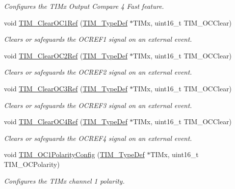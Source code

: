 \begin{DoxyCompactItemize}
\begin{DoxyCompactList}\small\item\em Configures the T\+I\+Mx Output Compare 4 Fast feature. \end{DoxyCompactList}\item 
void \hyperlink{group___t_i_m_ga34e926cd8a99cfcc7480b2d6de5118b6}{T\+I\+M\+\_\+\+Clear\+O\+C1\+Ref} (\hyperlink{struct_t_i_m___type_def}{T\+I\+M\+\_\+\+Type\+Def} $\ast$T\+I\+Mx, uint16\+\_\+t T\+I\+M\+\_\+\+O\+C\+Clear)
\begin{DoxyCompactList}\small\item\em Clears or safeguards the O\+C\+R\+E\+F1 signal on an external event. \end{DoxyCompactList}\item 
void \hyperlink{group___t_i_m_gac474ebc815d24c8a589969e0c68b27b0}{T\+I\+M\+\_\+\+Clear\+O\+C2\+Ref} (\hyperlink{struct_t_i_m___type_def}{T\+I\+M\+\_\+\+Type\+Def} $\ast$T\+I\+Mx, uint16\+\_\+t T\+I\+M\+\_\+\+O\+C\+Clear)
\begin{DoxyCompactList}\small\item\em Clears or safeguards the O\+C\+R\+E\+F2 signal on an external event. \end{DoxyCompactList}\item 
void \hyperlink{group___t_i_m_ga0bd9476a14bd346c319945ec4fa2bc67}{T\+I\+M\+\_\+\+Clear\+O\+C3\+Ref} (\hyperlink{struct_t_i_m___type_def}{T\+I\+M\+\_\+\+Type\+Def} $\ast$T\+I\+Mx, uint16\+\_\+t T\+I\+M\+\_\+\+O\+C\+Clear)
\begin{DoxyCompactList}\small\item\em Clears or safeguards the O\+C\+R\+E\+F3 signal on an external event. \end{DoxyCompactList}\item 
void \hyperlink{group___t_i_m_gaeee5fa66b26e7c6f71850272dc3028f3}{T\+I\+M\+\_\+\+Clear\+O\+C4\+Ref} (\hyperlink{struct_t_i_m___type_def}{T\+I\+M\+\_\+\+Type\+Def} $\ast$T\+I\+Mx, uint16\+\_\+t T\+I\+M\+\_\+\+O\+C\+Clear)
\begin{DoxyCompactList}\small\item\em Clears or safeguards the O\+C\+R\+E\+F4 signal on an external event. \end{DoxyCompactList}\item 
void \hyperlink{group___t_i_m_ga03878f78163485c8a3508cff2111c297}{T\+I\+M\+\_\+\+O\+C1\+Polarity\+Config} (\hyperlink{struct_t_i_m___type_def}{T\+I\+M\+\_\+\+Type\+Def} $\ast$T\+I\+Mx, uint16\+\_\+t T\+I\+M\+\_\+\+O\+C\+Polarity)
\begin{DoxyCompactList}\small\item\em Configures the T\+I\+Mx channel 1 polarity. \end{DoxyCompactList}\item 

\end{DoxyCompactItemize}
